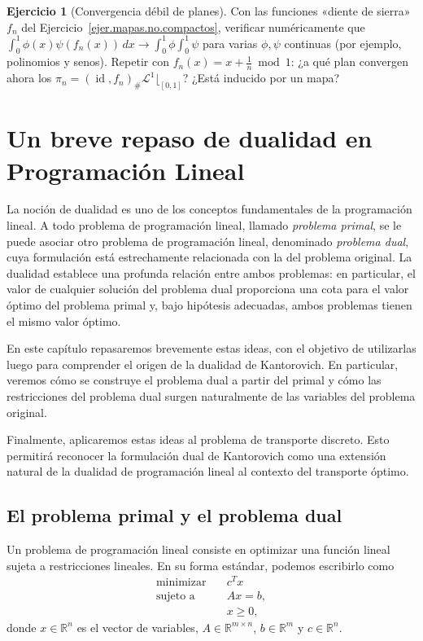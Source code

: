 \documentclass[12pt, a4paper]{amsbook}
\newcommand{\id}{\operatorname{id}}
\newcommand{\LL}{{\mathcal L}}
\theoremstyle{remark}
\theoremstyle{definition}
\newtheorem{ejercicio}{Ejercicio}[chapter]
\numberwithin{section}{chapter}
\numberwithin{subsection}{section}
\numberwithin{equation}{section}
\numberwithin{figure}{chapter}
\begin{document}
\begin{ejercicio}[Convergencia débil de planes]\label{ejc.MK.debil}
Con las funciones «diente de sierra» $f_n$ del
Ejercicio~\ref{ejer.mapas.no.compactos}, verificar numéricamente que
$\int_0^1\phi(x)\psi(f_n(x))\,dx\to\int_0^1\phi\int_0^1\psi$ para varias
$\phi,\psi$ continuas (por ejemplo, polinomios y senos). Repetir con
$f_n(x)=x+\frac1n \bmod 1$: ¿a qué plan convergen ahora los
$\pi_n=(\id,f_n)_\#\LL^1\lfloor_{[0,1]}$? ¿Está inducido por un mapa?
\end{ejercicio}

\chapter{Un breve repaso de dualidad en Programación Lineal}\label{cap.PL}
La noción de dualidad es uno de los conceptos fundamentales de la
programación lineal. A todo problema de programación lineal, llamado
\emph{problema primal}, se le puede asociar otro problema de programación
lineal, denominado \emph{problema dual}, cuya formulación está estrechamente
relacionada con la del problema original. La dualidad establece una profunda
relación entre ambos problemas: en particular, el valor de cualquier solución
del problema dual proporciona una cota para el valor óptimo del problema
primal y, bajo hipótesis adecuadas, ambos problemas tienen el mismo valor
óptimo.

En este capítulo repasaremos brevemente estas ideas, con el objetivo de
utilizarlas luego para comprender el origen de la dualidad de Kantorovich.
En particular, veremos cómo se construye el problema dual a partir del
primal y cómo las restricciones del problema dual surgen naturalmente de
las variables del problema original.

Finalmente, aplicaremos estas ideas al problema de transporte discreto.
Esto permitirá reconocer la formulación dual de Kantorovich como una
extensión natural de la dualidad de programación lineal al contexto del
transporte óptimo.

\section{El problema primal y el problema dual}

Un problema de programación lineal consiste en optimizar una función lineal
sujeta a restricciones lineales. En su forma estándar, podemos escribirlo
como
\[
\begin{aligned}
\text{minimizar}\quad & c^T x\\
\text{sujeto a}\quad & Ax=b,\\
& x\geq 0,
\end{aligned}
\]
donde $x\in\mathbb R^n$ es el vector de variables, $A\in\mathbb R^{m\times n}$,
$b\in\mathbb R^m$ y $c\in\mathbb R^n$.
\end{document}
